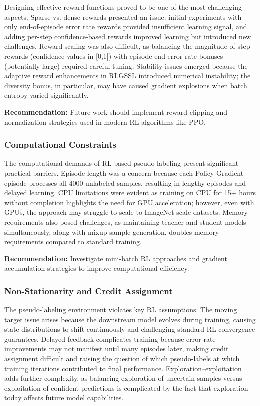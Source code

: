 \documentclass{scrartcl}
\begin{document}
Designing effective reward functions proved to be one of the most challenging aspects. Sparse vs. dense rewards presented an issue: initial experiments with only end-of-episode error rate rewards provided insufficient learning signal, and adding per-step confidence-based rewards improved learning but introduced new challenges. Reward scaling was also difficult, as balancing the magnitude of step rewards (confidence values in [0,1]) with episode-end error rate bonuses (potentially large) required careful tuning. Stability issues emerged because the adaptive reward enhancements in RLGSSL introduced numerical instability; the diversity bonus, in particular, may have caused gradient explosions when batch entropy varied significantly.

\textbf{Recommendation:} Future work should implement reward clipping and normalization strategies used in modern RL algorithms like PPO.

\subsubsection{Computational Constraints}

The computational demands of RL-based pseudo-labeling present significant practical barriers. Episode length was a concern because each Policy Gradient episode processes all 4000 unlabeled samples, resulting in lengthy episodes and delayed learning. CPU limitations were evident as training on CPU for 15+ hours without completion highlights the need for GPU acceleration; however, even with GPUs, the approach may struggle to scale to ImageNet-scale datasets. Memory requirements also posed challenges, as maintaining teacher and student models simultaneously, along with mixup sample generation, doubles memory requirements compared to standard training.

\textbf{Recommendation:} Investigate mini-batch RL approaches and gradient accumulation strategies to improve computational efficiency.

\subsubsection{Non-Stationarity and Credit Assignment}

The pseudo-labeling environment violates key RL assumptions. The moving target issue arises because the downstream model evolves during training, causing state distributions to shift continuously and challenging standard RL convergence guarantees. Delayed feedback complicates training because error rate improvements may not manifest until many episodes later, making credit assignment difficult and raising the question of which pseudo-labels at which training iterations contributed to final performance. Exploration–exploitation adds further complexity, as balancing exploration of uncertain samples versus exploitation of confident predictions is complicated by the fact that exploration today affects future model capabilities.
\end{document}
